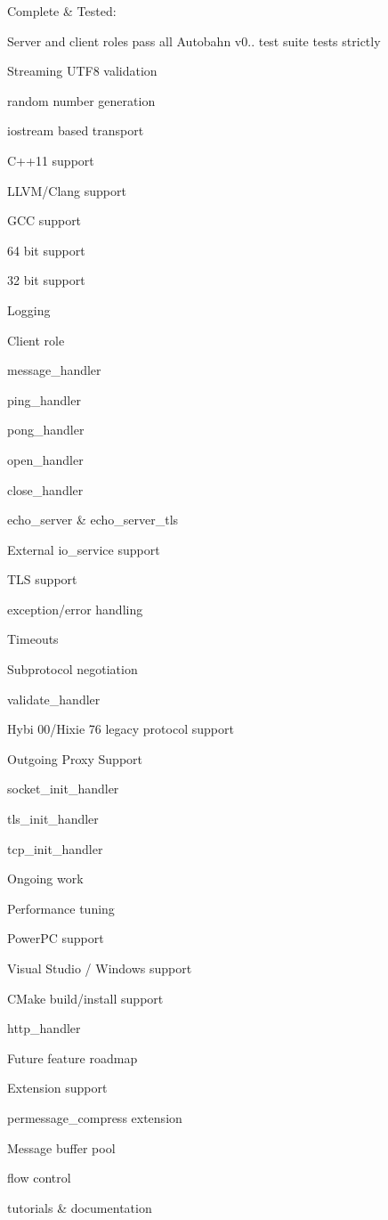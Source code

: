 Complete \& Tested\+:
\begin{DoxyItemize}
\item Server and client roles pass all Autobahn v0.. test suite tests strictly
\item Streaming U\+T\+F8 validation
\item random number generation
\item iostream based transport
\item C++11 support
\item L\+L\+V\+M/\+Clang support
\item G\+CC support
\item 64 bit support
\item 32 bit support
\item Logging
\item Client role
\item message\+\_\+handler
\item ping\+\_\+handler
\item pong\+\_\+handler
\item open\+\_\+handler
\item close\+\_\+handler
\item echo\+\_\+server \& echo\+\_\+server\+\_\+tls
\item External io\+\_\+service support
\item T\+LS support
\item exception/error handling
\item Timeouts
\item Subprotocol negotiation
\item validate\+\_\+handler
\item Hybi 00/\+Hixie 76 legacy protocol support
\item Outgoing Proxy Support
\item socket\+\_\+init\+\_\+handler
\item tls\+\_\+init\+\_\+handler
\item tcp\+\_\+init\+\_\+handler
\end{DoxyItemize}

Ongoing work
\begin{DoxyItemize}
\item Performance tuning
\item Power\+PC support
\item Visual Studio / Windows support
\item C\+Make build/install support
\item http\+\_\+handler
\end{DoxyItemize}

Future feature roadmap
\begin{DoxyItemize}
\item Extension support
\item permessage\+\_\+compress extension
\item Message buffer pool
\item flow control
\item tutorials \& documentation 
\end{DoxyItemize}